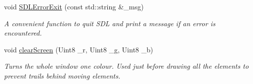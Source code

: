\begin{DoxyCompactItemize}
void \hyperlink{classGUI_1_1DealerGUI_a69617e99be7bc30bb13a108f46272ef7}{S\-D\-L\-Error\-Exit} (const std\-::string \&\-\_\-msg)
\begin{DoxyCompactList}\small\item\em A convenient function to quit S\-D\-L and print a message if an error is encountered. \end{DoxyCompactList}\item 
void \hyperlink{classGUI_1_1DealerGUI_a3398dc062bf31a05034e50ebf8a1700f}{clear\-Screen} (Uint8 \-\_\-r, Uint8 \-\_\-g, Uint8 \-\_\-b)
\begin{DoxyCompactList}\small\item\em Turns the whole window one colour. Used just before drawing all the elements to prevent trails behind moving elements. \end{DoxyCompactList}\end{DoxyCompactItemize}
